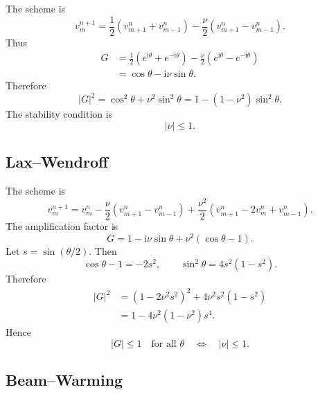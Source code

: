 \documentclass[11pt]{article}
\newcommand{\ii}{\mathrm{i}}
\begin{document}
The scheme is
\begin{equation}
    v_m^{n+1}
    =
    \frac12(v_{m+1}^n+v_{m-1}^n)
    -\frac{\nu}{2}(v_{m+1}^n-v_{m-1}^n).
\end{equation}
Thus
\begin{align}
    G
    &=
    \frac12(e^{\ii\theta}+e^{-\ii\theta})
    -\frac{\nu}{2}(e^{\ii\theta}-e^{-\ii\theta})\\
    &=
    \cos\theta-\ii\nu\sin\theta.
\end{align}
Therefore
\begin{equation}
    |G|^2
    =
    \cos^2\theta+\nu^2\sin^2\theta
    =
    1-(1-\nu^2)\sin^2\theta.
\end{equation}
The stability condition is
\begin{equation}
    |\nu|\le1.
\end{equation}

\subsection{Lax--Wendroff}

The scheme is
\begin{equation}
    v_m^{n+1}
    =
    v_m^n
    -\frac{\nu}{2}(v_{m+1}^n-v_{m-1}^n)
    +\frac{\nu^2}{2}(v_{m+1}^n-2v_m^n+v_{m-1}^n).
\end{equation}
The amplification factor is
\begin{equation}
    G=
    1-\ii\nu\sin\theta+\nu^2(\cos\theta-1).
\end{equation}
Let $s=\sin(\theta/2)$.  Then
\begin{equation}
    \cos\theta-1=-2s^2,
    \qquad
    \sin^2\theta=4s^2(1-s^2).
\end{equation}
Therefore
\begin{align}
    |G|^2
    &=
    (1-2\nu^2s^2)^2+4\nu^2s^2(1-s^2)\\
    &=
    1-4\nu^2(1-\nu^2)s^4.
\end{align}
Hence
\begin{equation}
    |G|\le1\quad \text{for all }\theta
    \quad\Longleftrightarrow\quad
    |\nu|\le1.
\end{equation}

\subsection{Beam--Warming}
\end{document}
